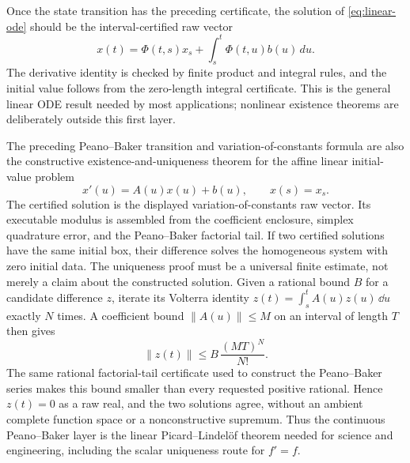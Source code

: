 \begin{theorem}
\label{thm:variation-of-constants}
Once the state transition has the preceding certificate, the solution of
\eqref{eq:linear-ode} should be the interval-certified raw vector
\[
 x(t)=\Phi(t,s)x_s+\int_s^t\Phi(t,u)b(u)\,du.
\]
The derivative identity is checked by finite product and integral rules, and
the initial value follows from the zero-length integral certificate. This is
the general linear ODE result needed by most applications; nonlinear
existence theorems are deliberately outside this first layer.
\end{theorem}

\begin{theorem}
\label{thm:linear-picard-lindelof}
The preceding Peano--Baker transition and variation-of-constants formula are
also the constructive existence-and-uniqueness theorem for the affine linear
initial-value problem
\[
  x'(u)=A(u)x(u)+b(u),\qquad x(s)=x_s.
\]
The certified solution is the displayed variation-of-constants raw vector.
Its executable modulus is assembled from the coefficient enclosure, simplex
quadrature error, and the Peano--Baker factorial tail.  If two certified
solutions have the same initial box, their difference solves the homogeneous
system with zero initial data.  The uniqueness proof must be a universal
finite estimate, not merely a claim about the constructed solution.  Given a
rational bound \(B\) for a candidate difference \(z\), iterate its Volterra
identity \(z(t)=\int_s^tA(u)z(u)\,\dd u\) exactly \(N\) times.  A coefficient
bound \(\lVert A(u)\rVert\le M\) on an interval of length \(T\) then gives
\[
  \lVert z(t)\rVert\le B\,\frac{(MT)^N}{N!}.
\]
The same rational factorial-tail certificate used to construct the
Peano--Baker series makes this bound smaller than every requested positive
rational.  Hence \(z(t)=0\) as a raw real, and the two solutions agree,
without an ambient complete function space or a nonconstructive supremum.
Thus the continuous Peano--Baker layer is the linear Picard--Lindel\"of
theorem needed for science and engineering, including the scalar uniqueness
route for \(f'=f\).


\end{theorem}
